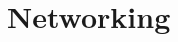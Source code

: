 \documentclass[a4paper,11pt]{book}
\theoremstyle{plain}
\theoremstyle{definition}
\begin{document}
\chapter{Networking}
\end{document}
